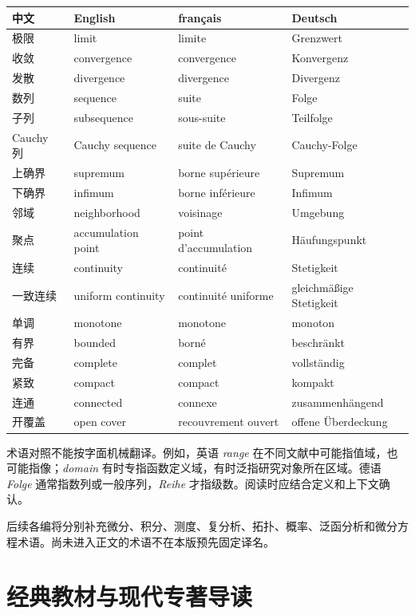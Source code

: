 \begin{center}
\small
\begin{tabular}{llll}
\toprule
中文 & English & fran\c{c}ais & Deutsch\\
\midrule
极限 & limit & limite & Grenzwert\\
收敛 & convergence & convergence & Konvergenz\\
发散 & divergence & divergence & Divergenz\\
数列 & sequence & suite & Folge\\
子列 & subsequence & sous-suite & Teilfolge\\
Cauchy 列 & Cauchy sequence & suite de Cauchy & Cauchy-Folge\\
上确界 & supremum & borne sup\'erieure & Supremum\\
下确界 & infimum & borne inf\'erieure & Infimum\\
邻域 & neighborhood & voisinage & Umgebung\\
聚点 & accumulation point & point d'accumulation & H\"aufungspunkt\\
连续 & continuity & continuit\'e & Stetigkeit\\
一致连续 & uniform continuity & continuit\'e uniforme & gleichm\"a\ss ige Stetigkeit\\
单调 & monotone & monotone & monoton\\
有界 & bounded & born\'e & beschr\"ankt\\
完备 & complete & complet & vollst\"andig\\
紧致 & compact & compact & kompakt\\
连通 & connected & connexe & zusammenh\"angend\\
开覆盖 & open cover & recouvrement ouvert & offene \"Uberdeckung\\
\bottomrule
\end{tabular}
\end{center}

术语对照不能按字面机械翻译。例如，英语 \emph{range} 在不同文献中可能指值域，也可能指像；\emph{domain} 有时专指函数定义域，有时泛指研究对象所在区域。德语 \emph{Folge} 通常指数列或一般序列，\emph{Reihe} 才指级数。阅读时应结合定义和上下文确认。

后续各编将分别补充微分、积分、测度、复分析、拓扑、概率、泛函分析和微分方程术语。尚未进入正文的术语不在本版预先固定译名。

\section{经典教材与现代专著导读}

